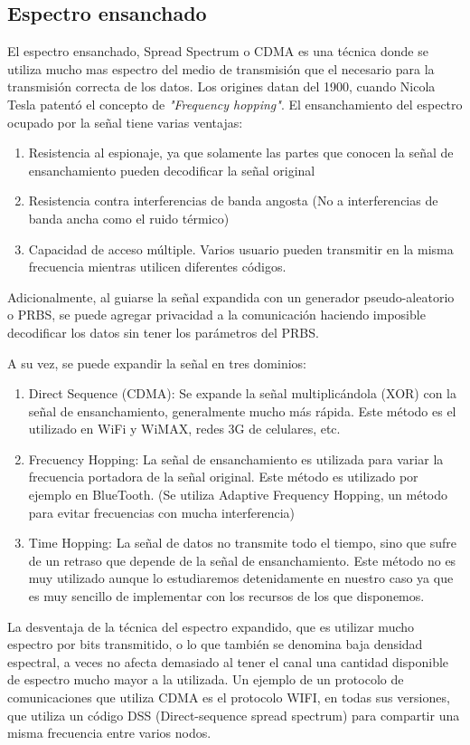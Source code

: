 \subsection{Espectro ensanchado}
\label{espectroensanchado}
El espectro ensanchado, Spread Spectrum o CDMA es una técnica donde se utiliza mucho mas espectro del medio de transmisión que el necesario para la transmisión correcta de los datos.
Los origines datan del 1900, cuando Nicola Tesla patentó el concepto de \textit{"Frequency hopping"}.
El ensanchamiento del espectro ocupado por la señal tiene varias ventajas:
\begin{enumerate} 
\item Resistencia al espionaje, ya que solamente las partes que conocen la señal de ensanchamiento pueden decodificar la señal original
\item Resistencia contra interferencias de banda angosta (No a interferencias de banda ancha como el ruido térmico)
\item Capacidad de acceso múltiple. Varios usuario pueden transmitir en la misma frecuencia mientras utilicen diferentes códigos.
\end{enumerate} 
Adicionalmente, al guiarse la señal expandida con un generador pseudo-aleatorio o PRBS, se puede agregar privacidad a la comunicación haciendo imposible decodificar los datos sin tener los parámetros del PRBS.

A su vez, se puede expandir la señal en tres dominios:
\begin{enumerate} 
\item Direct Sequence (CDMA): Se expande la señal multiplicándola (XOR) con la señal de ensanchamiento, generalmente mucho más rápida. Este método es el utilizado en WiFi y WiMAX, redes 3G de celulares, etc.
\item Frecuency Hopping: La señal de ensanchamiento es utilizada para variar la frecuencia portadora de la señal original. Este método es utilizado por ejemplo en BlueTooth. (Se utiliza Adaptive Frequency Hopping, un método para evitar frecuencias con mucha interferencia)
\item Time Hopping: La señal de datos no transmite todo el tiempo, sino que sufre de un retraso que depende de la señal de ensanchamiento. Este método no es muy utilizado aunque lo estudiaremos detenidamente en nuestro caso ya que es muy sencillo de implementar con los recursos de los que disponemos.
\end{enumerate} 


La desventaja de la técnica del espectro expandido, que es utilizar mucho espectro por bits transmitido, o lo que también se denomina baja densidad espectral, a veces no afecta demasiado al tener el canal una cantidad disponible de espectro mucho mayor a la utilizada. Un ejemplo de un protocolo de comunicaciones que utiliza CDMA es el protocolo WIFI, en todas sus versiones, que utiliza un código DSS (Direct-sequence spread spectrum) para compartir una misma frecuencia entre varios nodos.

